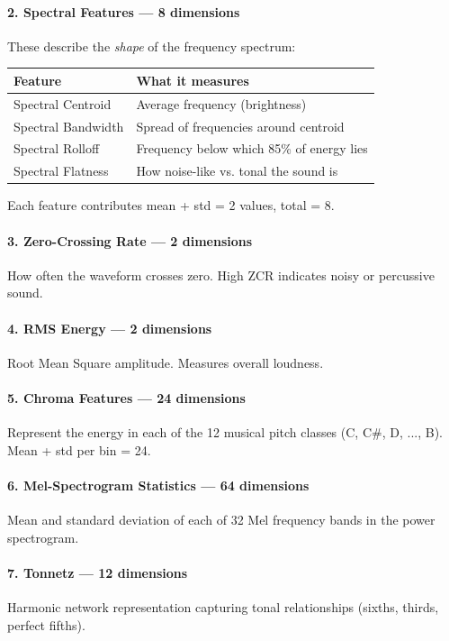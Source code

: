 \documentclass[12pt,a4paper]{article}
\begin{document}
\paragraph{2. Spectral Features --- 8 dimensions}
These describe the \textit{shape} of the frequency spectrum:

\begin{center}
\begin{tabular}{ll}
\toprule
\textbf{Feature} & \textbf{What it measures} \\
\midrule
Spectral Centroid & Average frequency (brightness) \\
Spectral Bandwidth & Spread of frequencies around centroid \\
Spectral Rolloff & Frequency below which 85\% of energy lies \\
Spectral Flatness & How noise-like vs. tonal the sound is \\
\bottomrule
\end{tabular}
\end{center}

Each feature contributes mean + std = 2 values, total = 8.

\paragraph{3. Zero-Crossing Rate --- 2 dimensions}
How often the waveform crosses zero. High ZCR indicates noisy or percussive sound.

\paragraph{4. RMS Energy --- 2 dimensions}
Root Mean Square amplitude. Measures overall loudness.

\paragraph{5. Chroma Features --- 24 dimensions}
Represent the energy in each of the 12 musical pitch classes (C, C\#, D, ..., B). Mean + std per bin = 24.

\paragraph{6. Mel-Spectrogram Statistics --- 64 dimensions}
Mean and standard deviation of each of 32 Mel frequency bands in the power spectrogram.

\paragraph{7. Tonnetz --- 12 dimensions}
Harmonic network representation capturing tonal relationships (sixths, thirds, perfect fifths).
\end{document}
